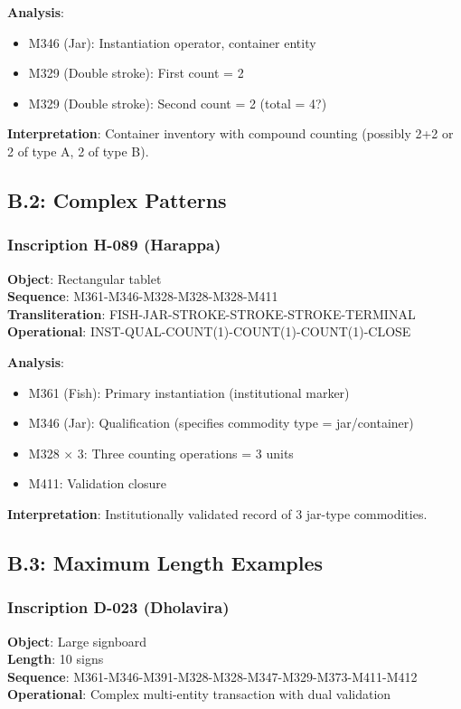 \textbf{Analysis}:
\begin{itemize}
    \item M346 (Jar): Instantiation operator, container entity
    \item M329 (Double stroke): First count = 2
    \item M329 (Double stroke): Second count = 2 (total = 4?)
\end{itemize}

\textbf{Interpretation}: Container inventory with compound counting (possibly 2+2 or 2 of type A, 2 of type B).

\subsection*{B.2: Complex Patterns}

\subsubsection*{Inscription H-089 (Harappa)}
\textbf{Object}: Rectangular tablet \\
\textbf{Sequence}: M361-M346-M328-M328-M328-M411 \\
\textbf{Transliteration}: FISH-JAR-STROKE-STROKE-STROKE-TERMINAL \\
\textbf{Operational}: INST-QUAL-COUNT(1)-COUNT(1)-COUNT(1)-CLOSE

\textbf{Analysis}:
\begin{itemize}
    \item M361 (Fish): Primary instantiation (institutional marker)
    \item M346 (Jar): Qualification (specifies commodity type = jar/container)
    \item M328 $\times$ 3: Three counting operations = 3 units
    \item M411: Validation closure
\end{itemize}

\textbf{Interpretation}: Institutionally validated record of 3 jar-type commodities.

\subsection*{B.3: Maximum Length Examples}

\subsubsection*{Inscription D-023 (Dholavira)}
\textbf{Object}: Large signboard \\
\textbf{Length}: 10 signs \\
\textbf{Sequence}: M361-M346-M391-M328-M328-M347-M329-M373-M411-M412 \\
\textbf{Operational}: Complex multi-entity transaction with dual validation

